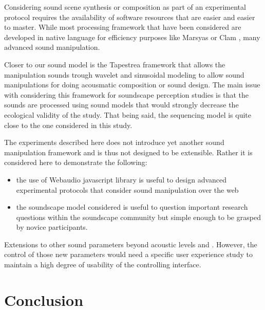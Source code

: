 \documentclass[12pt]{elsarticle}
\begin{document}
Considering sound scene synthesis or composition as part of an experimental protocol requires the availability of software resources that are easier and easier to master. While most processing framework that have been considered are developed in native language for efficiency purposes like Marsyas \cite{tzanetakis2000marsyas} or Clam \cite{amatriain2006clam}, many advanced sound manipulation.

Closer to our sound model is the Tapestrea framework \cite{misra2007musical} that allows the manipulation sounds trough wavelet and sinusoidal modeling to allow sound manipulations for doing acousmatic composition or sound
design. The main issue with considering this framework for soundscape perception studies is that the sounds are processed using sound models that would strongly decrease the ecological validity of the study. That being said, the sequencing model is quite close to the one considered in this study.

The experiments described here does not introduce yet another sound manipulation framework and is thus not designed to be extensible. Rather it is considered here to demonstrate the following:
\begin{itemize}
  \item the use of Webaudio javascript library is useful to design advanced experimental protocols that consider sound manipulation over the web
  \item the soundscape model considered is useful to question important research questions within the soundscape community  but simple enough to be grasped by novice participants.
\end{itemize}

Extensions to other sound parameters beyond acoustic levels and . However, the control of those new parameters would need a specific user experience study to maintain a high degree of usability of the controlling interface.









\section{Conclusion}

\end{document}
